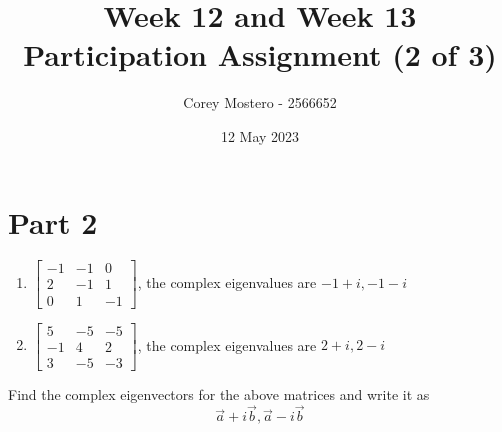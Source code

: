 \documentclass{article}
\title{Week 12 and Week 13 Participation Assignment (2 of 3)}
\date{12 May 2023}
\author{Corey Mostero - 2566652}
\begin{document}
\newcommand{\hr}{\par\noindent\rule{\textwidth}{0.4pt}}

\newcommand{\bc}[1]{
	\begin{equation*}
		\begin{boxed}
			{#1}
		\end{boxed}
	\end{equation*}
}

\newcommand{\cond}[2]{
	\ifmmode
		{#1} \quad {#2}
	\else
		$$ {#1} \quad {#2} $$
	\fi
}

\newcommand{\matr}[1]{\bm{#1}}

\newcommand{\vect}[1]{\mathbf{#1}}

\maketitle
\newpage

\tableofcontents

\section{Part 2}

\begin{enumerate}[label = \textbf{\arabic*)}]
	\item
		$ \begin{bmatrix}
			-1 & -1 & 0 \\
			2 & -1 & 1 \\
			0 & 1 & -1
		\end{bmatrix} $, the complex eigenvalues are $ {-1 + i, -1 - i} $
	\item
		$ \begin{bmatrix}
			5 & -5 & -5 \\
			-1 & 4 & 2 \\
			3 & -5 & -3
		\end{bmatrix} $, the complex eigenvalues are $ {2 + i, 2 - i} $
\end{enumerate}
Find the complex eigenvectors for the above matrices and write it as
\begin{equation*}
	\vec{a} + i\vec{b}, \vec{a} - i\vec{b}
\end{equation*}
\end{document}
